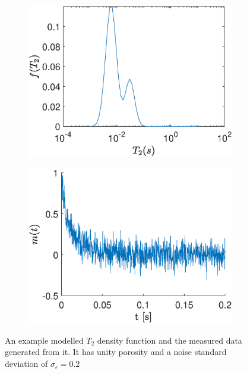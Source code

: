 \begin{figure} [h]
    \centering
    \begin{subfigure}[b]{0.495\textwidth}
        \includegraphics[width=\textwidth]{backgroundVector/densityFunction.eps}
        \label{fig:densityFunction}
    \end{subfigure}
    \begin{subfigure}[b]{0.495\textwidth}
        \includegraphics[width=\textwidth]{backgroundVector/measured.eps}
        \label{fig:measuredData}
    \end{subfigure}
    
    \caption{An example modelled $T_2$ density function and the measured data generated from it. It has unity porosity and a noise standard deviation of $\sigma_\epsilon = 0.2$}
    \label{fig:theModel}
\end{figure}

